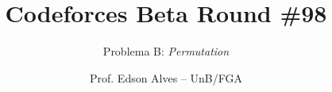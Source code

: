 \title{Codeforces Beta Round \#98}
\subtitle{Problema B: \textit{Permutation}}
\author{Prof. Edson Alves -- UnB/FGA}
\date{}

